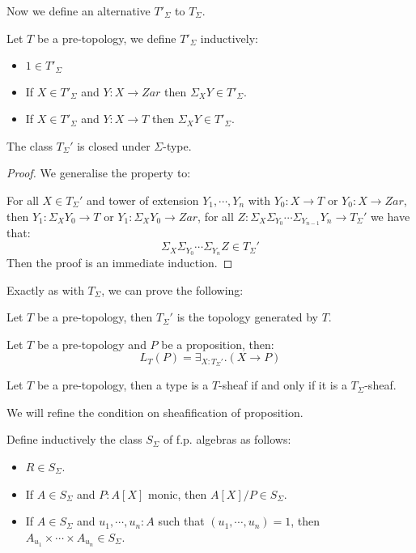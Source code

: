 Now we define an alternative $T'_\Sigma$ to $T_\Sigma$. 

\begin{definition}
Let $T$ be a pre-topology, we define $T'_\Sigma$ inductively:
\begin{itemize}
\item $1\in T'_\Sigma$
\item If $X\in T'_\Sigma$ and $Y:X\to Zar$ then $\Sigma_XY\in T'_\Sigma$.
\item If $X\in T'_\Sigma$ and $Y:X\to T$ then $\Sigma_XY\in T'_\Sigma$.
\end{itemize}
\end{definition}

\begin{lemma}
The class $T_\Sigma'$ is closed under $\Sigma$-type.
\end{lemma}

\begin{proof}
We generalise the property to: 

For all $X\in T_\Sigma'$ and tower of extension $Y_1,\cdots,Y_n$ with $Y_0:X\to T$ or $Y_0:X\to Zar$, then $Y_1:\Sigma_{X}Y_0\to T$ or $Y_1:\Sigma_{X}Y_0\to Zar$, for all $Z:\Sigma_X\Sigma_{Y_0}\cdots\Sigma_{Y_{n-1}}Y_n \to T_\Sigma'$ we have that:
\[\Sigma_X\Sigma_{Y_0}\cdots\Sigma_{Y_{n}}Z \in T_\Sigma'\]
Then the proof is an immediate induction.
\end{proof}

Exactly as with $T_\Sigma$, we can prove the following:

\begin{lemma}\label{TSigma'-topology}
Let $T$ be a pre-topology, then $T_\Sigma'$ is the topology generated by $T$.
\end{lemma}

\begin{lemma}\label{Tsigma'-proposition}
Let $T$ be a pre-topology and $P$ be a proposition, then:
\[L_T(P) = \exists_{X:T_\Sigma'}. (X\to P)\]
\end{lemma}

\begin{lemma}\label{Tsigma'-sheaf-generated}
Let $T$ be a pre-topology, then a type is a $T$-sheaf if and only if it is a $T_\Sigma$-sheaf.
\end{lemma}

We will refine the condition on sheafification of proposition.

\begin{definition}
Define inductively the class $S_\Sigma$ of f.p. algebras as follows:
\begin{itemize}
\item $R\in S_\Sigma$.
\item If $A\in S_\Sigma$ and $P:A[X]$ monic, then $A[X]/P\in S_\Sigma$.
\item If $A\in S_\Sigma$ and $u_1,\cdots,u_n:A$ such that $(u_1,\cdots,u_n)=1$, then $A_{u_1}\times\cdots\times A_{u_n}\in S_\Sigma$.
\end{itemize} 
\end{definition}


